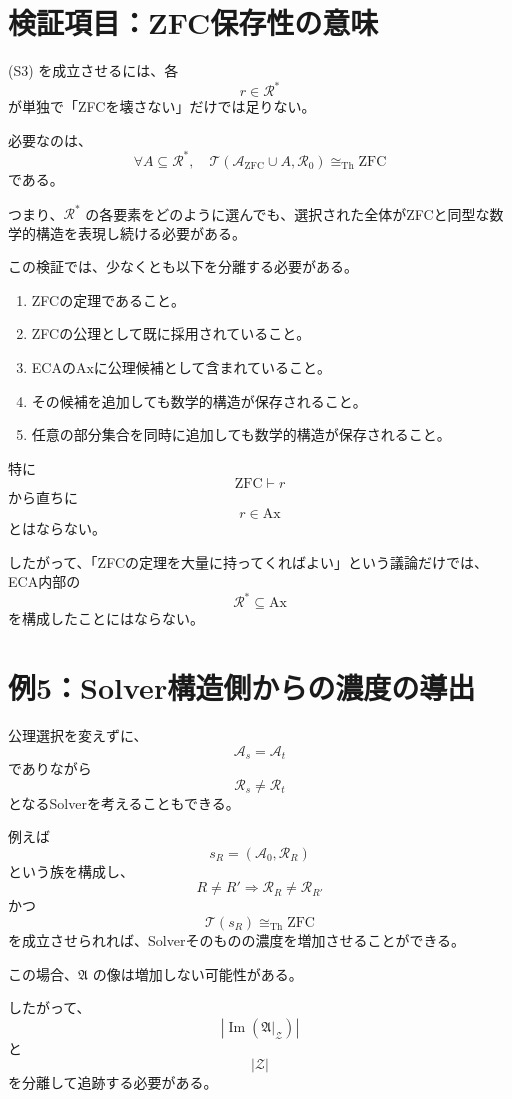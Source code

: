 \documentclass[a4paper,11pt]{article}
\newcommand{\Ax}{\mathrm{Ax}}
\newcommand{\ZFC}{\mathrm{ZFC}}
\begin{document}
\section{検証項目：ZFC保存性の意味}

(S3) を成立させるには、各
\[
r\in\mathcal{R}^*
\]
が単独で「ZFCを壊さない」だけでは足りない。

必要なのは、
\[
\boxed{
\forall A\subseteq\mathcal{R}^*,
\quad
\mathcal{T}
\left(
\mathcal{A}_{\mathrm{ZFC}}\cup A,\mathcal{R}_0
\right)
\cong_{\mathrm{Th}}
\ZFC
}
\]
である。

つまり、\(\mathcal{R}^*\) の各要素をどのように選んでも、選択された全体がZFCと同型な数学的構造を表現し続ける必要がある。

この検証では、少なくとも以下を分離する必要がある。
\begin{enumerate}
  \item ZFCの定理であること。
  \item ZFCの公理として既に採用されていること。
  \item ECAの$\Ax$に公理候補として含まれていること。
  \item その候補を追加しても数学的構造が保存されること。
  \item 任意の部分集合を同時に追加しても数学的構造が保存されること。
\end{enumerate}

特に
\[
\ZFC\vdash r
\]
から直ちに
\[
r\in\Ax
\]
とはならない。

したがって、「ZFCの定理を大量に持ってくればよい」という議論だけでは、ECA内部の
\[
\mathcal{R}^*\subseteq\Ax
\]
を構成したことにはならない。

\section{例5：Solver構造側からの濃度の導出}

公理選択を変えずに、
\[
\mathcal{A}_s=\mathcal{A}_t
\]
でありながら
\[
\mathcal{R}_s\neq\mathcal{R}_t
\]
となるSolverを考えることもできる。

例えば
\[
s_R=(\mathcal{A}_0,\mathcal{R}_R)
\]
という族を構成し、
\[
R\neq R'
\Longrightarrow
\mathcal{R}_R\neq\mathcal{R}_{R'}
\]
かつ
\[
\mathcal{T}(s_R)
\cong_{\mathrm{Th}}
\ZFC
\]
を成立させられれば、Solverそのものの濃度を増加させることができる。

この場合、\(\mathfrak A\) の像は増加しない可能性がある。

したがって、
\[
\left|\operatorname{Im}
(\mathfrak A|_{\mathcal{Z}})\right|
\]
と
\[
|\mathcal{Z}|
\]
を分離して追跡する必要がある。
\end{document}
